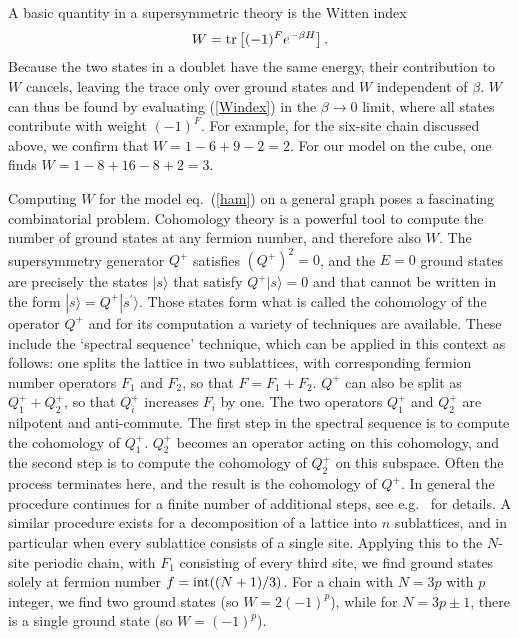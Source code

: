 \documentclass[a4paper,prl,aps,twocolumn]{revtex4}
\begin{document}
A basic quantity in a supersymmetric theory is the Witten index~\cite{Witten}  
\begin{equation}
W = \hbox{tr}\left[(-1)^F e^{-\beta H}\right]. \label{Windex}
\end{equation}
Because the two states in a doublet have the same energy, their
contribution to $W$ cancels, leaving the trace only over ground states
and $W$ independent of $\beta$.  $W$ can thus be found by evaluating
(\ref{Windex}) in the $\beta \to 0$ limit, where all states contribute
with weight $(-1)^F$.  For example, for the six-site chain discussed
above, we confirm that $W=1-6+9-2=2$. For our model on the cube, one
finds $W=1-8+16-8+2=3$.

Computing $W$ for the model eq.~(\ref{ham}) on a general graph poses a
fascinating combinatorial problem.  Cohomology theory is a powerful
tool to compute the number of ground states at any fermion number, and
therefore also $W$. The supersymmetry generator $Q^+$ satisfies
$(Q^+)^2=0$, and the $E=0$ ground states are precisely the states
$|s\rangle$ that satisfy $Q^+|s\rangle = 0$ and that cannot be written
in the form $|s\rangle=Q^+|s^\prime\rangle$. Those states form what is
called the cohomology of the operator $Q^+$ and for its computation a
variety of techniques are available. These include the `spectral
sequence' technique, which can be applied in this context as follows:
one splits the lattice in two sublattices, with corresponding fermion
number operators $F_1$ and $F_2$, so that $F=F_1+F_2$. $Q^+$ can also
be split as $Q^+_1+ Q^+_2$, so that $Q_i^+$ increases $F_i$ by
one. The two operators $Q^+_1$ and $Q^+_2$ are nilpotent and
anti-commute. The first step in the spectral sequence is to compute
the cohomology of $Q^+_1$. $Q^+_2$ becomes an operator acting on this
cohomology, and the second step is to compute the cohomology of
$Q^+_2$ on this subspace.  Often the process terminates here, and the
result is the cohomology of $Q^+$. In general the procedure continues
for a finite number of additional steps, see e.g.~\cite{botttu} for
details.  A similar procedure exists for a decomposition of a lattice
into $n$ sublattices, and in particular when every sublattice consists
of a single site.  Applying this to the $N$-site periodic chain, with
$F_1$ consisting of every third site, we find ground states solely at
fermion number $f=\hbox{int}((N+1)/3)$. For a chain with $N=3p$ with
$p$ integer, we find two ground states (so $W=2(-1)^p$), while for
$N=3p\pm 1$, there is a single ground state (so $W=(-1)^p$).
\end{document}
